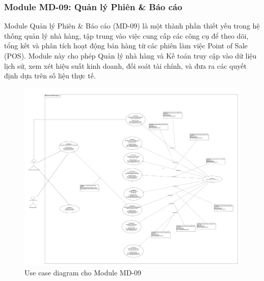 
\subsubsection{Module MD-09: Quản lý Phiên \& Báo cáo}

Module Quản lý Phiên \& Báo cáo (MD-09) là một thành phần thiết yếu trong hệ thống quản lý nhà hàng, tập trung vào việc cung cấp các công cụ để theo dõi, tổng kết và phân tích hoạt động bán hàng từ các phiên làm việc Point of Sale (POS). Module này cho phép Quản lý nhà hàng và Kế toán truy cập vào dữ liệu lịch sử, xem xét hiệu suất kinh doanh, đối soát tài chính, và đưa ra các quyết định dựa trên số liệu thực tế.




\begin{figure}[H]
    \centering
    \includegraphics[width=15cm]{Sections/tong_quan/functional_spec/img/uc9.png}
    \vspace{0.5cm}
    \caption{Use case diagram cho Module MD-09}
    \label{fig:my_label}
\end{figure}

